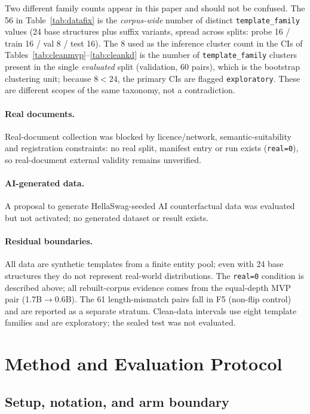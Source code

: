 \documentclass[11pt,twocolumn]{article}
\begin{document}
Two different family counts appear in this paper and should not be confused.
The 56 in Table~\ref{tab:datafix} is the \emph{corpus-wide} number of distinct
\texttt{template\_family} values (24 base structures plus suffix variants,
spread across splits: probe 16 / train 16 / val 8 / test 16). The 8 used as the
inference cluster count in the CIs of Tables~\ref{tab:cleanmvp}--\ref{tab:cleankd}
is the number of \texttt{template\_family} clusters present in the single
\emph{evaluated} split (validation, 60 pairs), which is the bootstrap
clustering unit; because $8<24$, the primary CIs are flagged
\texttt{exploratory}. These are different scopes of the same taxonomy, not a
contradiction.

\paragraph{Real documents.} Real-document collection was blocked by
licence/network, semantic-suitability and registration constraints: no real
split, manifest entry or run exists (\texttt{real=0}), so real-document
external validity remains unverified.

\paragraph{AI-generated data.} A proposal to generate HellaSwag-seeded AI
counterfactual data was evaluated but not activated; no generated dataset or
result exists.

\paragraph{Residual boundaries.} All data are synthetic templates from a
finite entity pool; even with 24 base structures they do not represent
real-world distributions. The \texttt{real=0} condition is described above;
all rebuilt-corpus evidence comes from the equal-depth MVP pair
(1.7B$\to$0.6B). The 61 length-mismatch pairs fall in F5 (non-flip control)
and are reported as a separate stratum. Clean-data intervals use eight
template families and are exploratory; the sealed test was not evaluated.

\section{Method and Evaluation Protocol}
\label{sec:method}

\subsection{Setup, notation, and arm boundary}
\label{sec:proposed}
\end{document}
